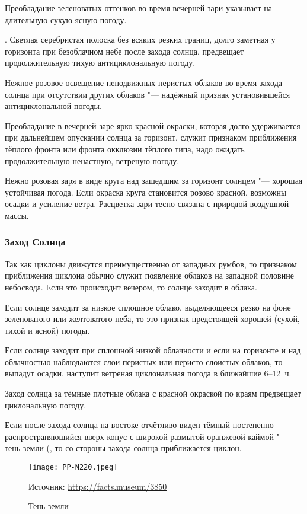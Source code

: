  Преобладание зеленоватых оттенков во время вечерней зари
указывает на длительную сухую ясную погоду.

. Светлая серебристая полоска без всяких резких границ, долго
заметная у горизонта при безоблачном небе после захода солнца,
предвещает продолжительную тихую антициклональную погоду.

 Нежное розовое освещение неподвижных перистых облаков во время
захода солнца при отсутствии других облаков "--- надёжный признак
установившейся антициклональной погоды.

 Преобладание в вечерней заре ярко красной окраски, которая
долго удерживается при дальнейшем опускании солнца за горизонт, служит
признаком приближения тёплого фронта или фронта окклюзии тёплого типа,
надо ожидать продолжительную ненастную, ветреную погоду.

 Нежно розовая заря в виде круга над зашедшим за горизонт солнцем
"--- хорошая устойчивая погода. Если окраска круга становится розово
красной, возможны осадки и усиление ветра. Расцветка зари тесно
связана с природой воздушной массы.

\subsubsection{Заход Солнца}

Так как циклоны движутся преимущественно от западных румбов, то
признаком приближения циклона обычно служит появление облаков на
западной половине небосвода. Если это происходит вечером, то солнце
заходит в облака.

 Если солнце заходит за низкое сплошное облако, выделяющееся
резко на фоне зеленоватого или желтоватого неба, то это признак
предстоящей хорошей (сухой, тихой и ясной) погоды.

 Если солнце заходит при сплошной низкой облачности и если на
горизонте и над облачностью наблюдаются слои перистых или
перисто-слоистых облаков, то выпадут осадки, наступит ветреная
циклональная погода в ближайшие 6--12~ч.

 Заход солнца за тёмные плотные облака с красной окраской по
краям предвещает циклональную погоду.

 Если после захода солнца на востоке отчётливо виден тёмный
постепенно распространяющийся вверх конус с широкой размытой оранжевой
каймой "--- тень земли (, то со стороны захода солнца
приближается циклон.

\begin{figure}[htb]
  \centering{}
  \texttt{[image: PP-N220.jpeg]}
  \caption{Тень земли}
  \label{fig:pp-n220}
  \scriptsize
  \centering{}Источник: \url{https://facts.museum/3850}
\end{figure}

